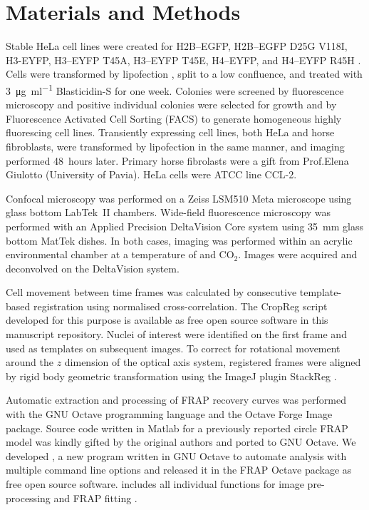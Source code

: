 \section{Materials and Methods}

  Stable HeLa cell lines were created for H2B--EGFP, H2B--EGFP D25G V118I,
  H3-EYFP, H3--EYFP T45A, H3--EYFP T45E, H4--EYFP, and H4--EYFP R45H
  .
  Cells were transformed by lipofection ,
  split to a low confluence, and treated
  with \SI{3}{\ug\per\ml} \mbox{Blasticidin-S} for one week.
  Colonies were screened by fluorescence microscopy
  and positive individual colonies were selected for growth
  and by Fluorescence Activated Cell Sorting (FACS) to generate
  homogeneous highly fluorescing cell lines.
  Transiently expressing cell lines, both HeLa and horse fibroblasts,
  were transformed by lipofection in
  the same manner, and imaging performed 48~hours later.
  Primary horse fibrolasts were a gift from Prof.\@ Elena Giulotto
  (University of Pavia). HeLa cells were ATCC line CCL-2.

  Confocal microscopy was performed on a Zeiss LSM510 Meta microscope
  using glass bottom LabTek~II chambers.  Wide-field fluorescence
  microscopy was performed with an Applied Precision DeltaVision Core
  system using \SI{35}{\mm} glass bottom MatTek dishes.  In both
  cases, imaging was performed within an acrylic environmental chamber
  at a temperature of  and  CO$_2$.
  Images were acquired and deconvolved on the DeltaVision system.


  Cell movement between time frames was calculated by consecutive
  template-based registration using normalised cross-correlation.
  The CropReg script developed for this purpose is available
  as free open source software in this manuscript repository.
  Nuclei of interest were identified
  on the first frame and used as templates on subsequent images.
  To correct for rotational movement
  around the $z$ dimension of the optical axis system,
  registered frames were aligned by rigid body geometric transformation
  using the ImageJ \citep{imagej1} plugin StackReg \citep{stackreg}.

  Automatic extraction and processing of FRAP recovery curves was
  performed with the GNU Octave programming language \citep{octave}
  and the Octave Forge Image package.  Source code written in Matlab
  for a previously reported circle FRAP model \citep{mcnally-frap-code}
  was kindly gifted by the original authors and ported to GNU Octave.
  We developed , a new program written in GNU Octave
  to automate analysis with multiple command line options
  and released it in the FRAP Octave package as free open source software.
   includes all individual functions for image
  pre-processing and FRAP fitting .
